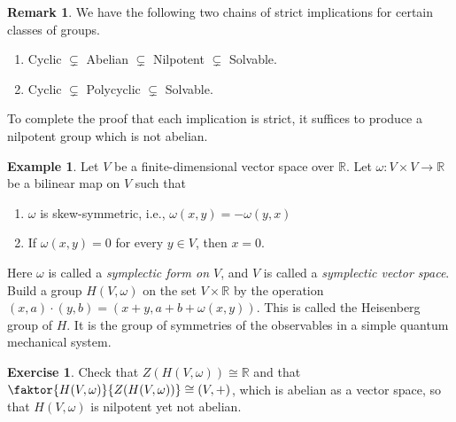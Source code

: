 \documentclass[10pt,letterpaper,cm]{nupset}
\theoremstyle{definition}
\newtheorem{exmp}{Example}
\newtheorem{remark}{Remark}
\newtheorem{exercise}{Exercise}
\newcommand{\R}{\mathbb R}
\newcommand{\1}{\mathbf{1}}
\newcommand{\0}{\vec 0}
\begin{document}
\begin{remark} We have the following two chains of strict implications for certain classes of groups.
\begin{enumerate}
\item Cyclic $\subsetneq$ Abelian $\subsetneq$ Nilpotent $\subsetneq$ Solvable.
\item Cyclic $\subsetneq$ Polycyclic $\subsetneq$  Solvable.
\end{enumerate}
To complete the proof that each implication is strict, it suffices to produce a nilpotent group which is not abelian.

\end{remark}

\begin{exmp}
Let $V$ be a finite-dimensional vector space over $\R$. Let $\omega: V\times V\to \R$ be a bilinear map on $V$ such that
\begin{enumerate}[label=(\alph*)]
\item $\omega$ is skew-symmetric, i.e., $\omega(x,y) = -\omega(y,x)$
\item If $\omega(x,y) =0$ for every $y \in V$, then $x=0$.
\end{enumerate}
Here $\omega$ is called a \textit{symplectic form on $V$}, and $V$ is called a \textit{symplectic vector space}. Build a group $H(V, \omega)$ on the set $V \times \R$ by the operation $(x,a)\cdot(y,b) = (x+y, a+b + \omega(x,y))$. This is called the Heisenberg group of $H$. It is the group of symmetries of the observables in a simple quantum mechanical system. 

\begin{exercise} 
Check that $Z(H(V, \omega)) \cong \R$ and that $\faktor{H(V, \omega)}{Z(H(V, \omega))} \cong (V, +)$, which is abelian as a vector space, so that $H(V, \omega)$ is nilpotent yet not abelian. 
\end{exercise}
\end{exmp}
\end{document}
